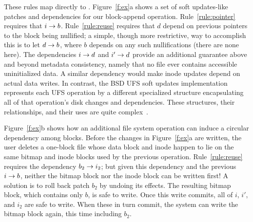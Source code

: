 These rules map directly to \Featherstitch.
%
Figure~\ref{f:ex}a shows a set of soft updates-like patches and dependencies for
 our block-append operation.
%
%
%
%
Rule~\ref{rule:pointer} requires that $i \rightarrow b$.
%
Rule~\ref{rule:reuse} requires that $d$ depend on previous pointers to the
 block being nullified;
%
a simple, though more restrictive, way to accomplish this is to let $d
 \rightarrow b$, where $b$ depends on any such nullifications
 (there are none here).
%
The dependencies $i \rightarrow d$ and $i' \rightarrow d$ provide an
 additional guarantee above and beyond metadata consistency, namely
 that no file ever contains accessible uninitialized data.
%
A similar dependency would make inode updates depend on actual data
 writes.
%
In contrast, the BSD UFS soft updates implementation represents each UFS
 operation by a different specialized structure encapsulating
 all of that operation's disk changes and dependencies.
These structures, their
relationships, and their uses %
are quite complex~\cite{mckusick99soft}.

\begin{comment}
\begin{figure}[htb]
  \centering
  \texttt{[image: fig/examplesb\_3]}
  \caption{\label{fig:softupdate} Soft updates \patches\
  for appending one block to an empty file in an FFS-like file system.}
\end{figure}
\end{comment}

Figure~\ref{f:ex}b shows how an additional file system operation can induce
 a circular dependency among blocks.
%
Before the changes in Figure~\ref{f:ex}a are written, the user deletes a
 one-block file whose data block and inode happen to lie on the same bitmap
 and inode blocks used by the previous operation.
%
Rule~\ref{rule:reuse} requires the dependency $b_2 \rightarrow i_2$; but
 given this dependency and the previous $i \rightarrow b$, neither the bitmap
 block nor the inode block can be written first!
%
A solution is to roll back patch $b_2$ by undoing its effects.
 The resulting bitmap block, which contains only
 $b$, is safe to write.  Once this write commits, all of $i$, $i'$, and
 $i_2$ are safe to write.  When these in turn commit, the system can write
 the bitmap block again, this time including $b_2$.


